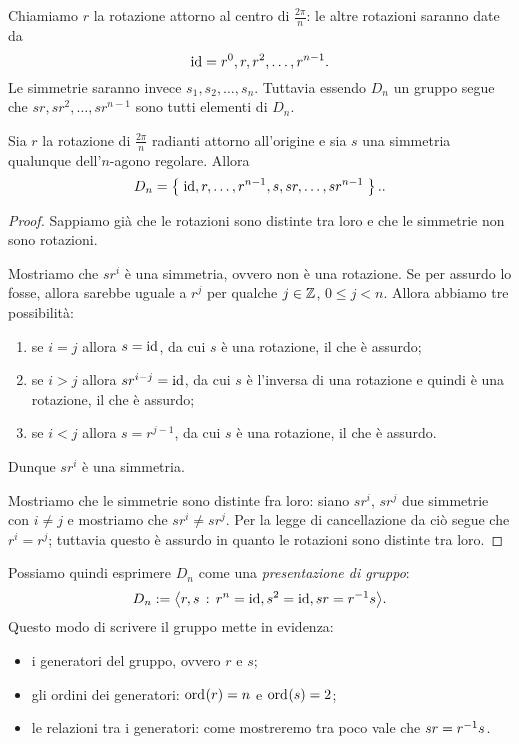Chiamiamo $r$ la rotazione attorno al centro di $\frac{2\pi}{n}$: le altre rotazioni saranno date da \[
    \operatorname{id} = r^0, r, r^2, \ldots, r^{n-1}
.\] Le simmetrie saranno invece $s_1, s_2, \ldots, s_n$. Tuttavia essendo $D_n$ un gruppo segue che $sr, sr^2, \ldots, sr^{n-1}$ sono tutti elementi di $D_n$.

\begin{proposition}
    Sia $r$ la rotazione di $\frac{2\pi}{n}$ radianti attorno all'origine e sia $s$ una simmetria qualunque dell'$n$-agono regolare. Allora \[
        D_n = \left\{\;\operatorname{id}, r, \ldots, r^{n-1}, s, sr, \ldots, sr^{n-1}\;\right\}.    
    .\] 
\end{proposition}
\begin{proof}
    Sappiamo già che le rotazioni sono distinte tra loro e che le simmetrie non sono rotazioni. 

    Mostriamo che $sr^i$ è una simmetria, ovvero non è una rotazione. Se per assurdo lo fosse, allora sarebbe uguale a $r^j$ per qualche  $j \in \mathbb{Z}$,  $0 \leq j < n$. Allora abbiamo tre possibilità:
     \begin{enumerate}
        \item se $i = j$ allora $s = \operatorname{id}$, da cui $s$ è una rotazione, il che è assurdo;
        \item se $i > j$ allora $sr^{i-j} = \operatorname{id}$, da cui $s$ è l'inversa di una rotazione e quindi è una rotazione, il che è assurdo;
        \item se $i < j$ allora $s = r^{j-1}$, da cui $s$ è una rotazione, il che è assurdo.
    \end{enumerate}
    Dunque $sr^i$ è una simmetria.

    Mostriamo che le simmetrie sono distinte fra loro: siano $sr^i$, $s r^j$ due simmetrie con $i \neq j$ e mostriamo che $sr^i \neq sr^j$. Per la legge di cancellazione da ciò segue che $r^i = r^j$; tuttavia questo è assurdo in quanto le rotazioni sono distinte tra loro.
\end{proof}

Possiamo quindi esprimere $D_n$ come una \emph{presentazione di gruppo}: \[
    D_n := \bigl\langle r, s \,:\, r^n = \operatorname{id}, s^2 = \operatorname{id}, sr = r^{-1} s\bigr\rangle.
\]
Questo modo di scrivere il gruppo mette in evidenza:
\begin{itemize}
    \item i generatori del gruppo, ovvero $r$ e $s$;
    \item gli ordini dei generatori: $\operatorname{ord}_{}\!\left( r \right) = n$ e $\operatorname{ord}_{}\!\left( s \right) = 2$;
    \item le relazioni tra i generatori: come mostreremo tra poco vale che $sr = r^{-1} s$.
\end{itemize}

